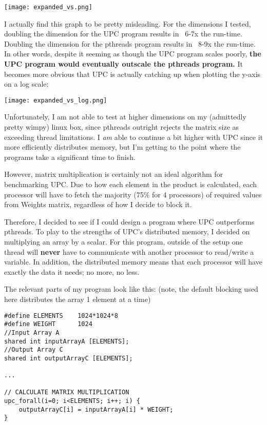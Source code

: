 \documentclass{article}
\begin{document}
\begin{center}
    \texttt{[image: expanded\_vs.png]}
\end{center}

I actually find this graph to be pretty misleading. For the dimensions I tested, doubling the dimension for the UPC program results in ~6-7x the run-time. Doubling the dimension for the pthreads program results in ~8-9x the run-time. In other words, despite it seeming as though the UPC program scales poorly, \textbf{the UPC program would eventually outscale the pthreads program.} It becomes more obvious that UPC is actually catching up when plotting the y-axis on a log scale:

\begin{center}
    \texttt{[image: expanded\_vs\_log.png]}
\end{center}

Unfortunately, I am not able to test at higher dimensions on my (admittedly pretty wimpy) linux box, since pthreads outright rejects the matrix size as exceeding thread limitations. I \emph{am} able to continue a bit higher with UPC since it more efficiently distributes memory, but I'm getting to the point where the programs take a significant time to finish.

However, matrix multiplication is certainly not an ideal algorithm for benchmarking UPC. Due to how each element in the product is calculated, each processor will have to fetch the majority (75\% for 4 processors) of required values from Weights matrix, regardless of how I decide to block it. 

Therefore, I decided to see if I could design a program where UPC outperforms pthreads. To play to the strengths of UPC's distributed memory, I decided on multiplying an array by a scalar. For this program, outside of the setup one thread will \textbf{never} have to communicate with another processor to read/write a variable. In addition, the distributed memory means that each processor will have exactly the data it needs; no more, no less.

The relevant parts of my program look like this: (note, the default blocking used here distributes the array 1 element at a time)

\begin{lstlisting}
#define ELEMENTS    1024*1024*8
#define WEIGHT      1024
//Input Array A
shared int inputArrayA [ELEMENTS];
//Output Array C
shared int outputArrayC [ELEMENTS];

...

// CALCULATE MATRIX MULTIPLICATION
upc_forall(i=0; i<ELEMENTS; i++; i) {
    outputArrayC[i] = inputArrayA[i] * WEIGHT;
}
\end{lstlisting}
\end{document}
